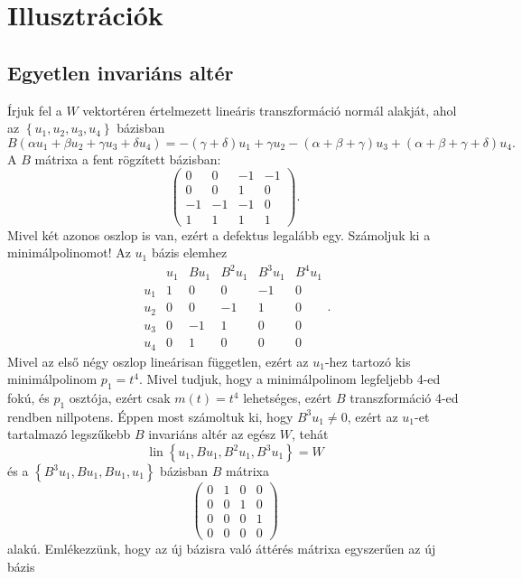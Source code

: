 \documentclass[9pt, a4paper, showtrims]{memoir}
\theoremstyle{plain}
\theoremstyle{remark}
\theoremstyle{definition}
\DeclareMathOperator{\lin}{lin}
\begin{document}
\section{Illusztrációk}
\subsection{Egyetlen invariáns altér}
Írjuk fel a $W$ vektortéren értelmezett lineáris transzformáció normál alakját,
ahol az $\left\{ u_1,u_2,u_3,u_4 \right\}$ bázisban
\[
    B\left( \alpha u_1+\beta u_2+\gamma u_3+\delta u_4 \right)=
    -\left( \gamma + \delta \right)u_1
    +\gamma u_2
    -\left( \alpha+\beta+\gamma \right)u_3
    +\left( \alpha+\beta+\gamma+\delta \right)u_4.
\]
A $B$ mátrixa a fent rögzített bázisban:
\[
    \begin{pmatrix}
        0 & 0 & -1&-1\\
        0 & 0 & 1 & 0\\
        -1 & -1& -1& 0\\
        1 & 1 & 1 & 1
    \end{pmatrix}.
\]
Mivel két azonos oszlop is van, ezért a defektus legalább egy.
Számoljuk ki a minimálpolinomot!
Az $u_1$ bázis elemhez
\[
\begin{array}{c|cccccc}
    & u_1 & Bu_1 & B^2u_1 & B^3u_1 & B^4u_1\\
    \hline
    u_1&   1 &    0 &      0 &  -1&   0\\
    u_2&   0 &    0 &     -1 &   1&   0\\
    u_3&   0 &   -1 &      1 &   0&   0\\
    u_4&   0 &    1 &      0 &   0&   0
\end{array}.
\]
Mivel az első négy oszlop lineárisan független,
ezért az $u_1$-hez tartozó kis minimálpolinom $p_1=t^4.$
Mivel tudjuk, hogy a minimálpolinom legfeljebb 4-ed fokú, és 
$p_1$ osztója, ezért csak $m\left( t \right)=t^4$ lehetséges,
ezért $B$ transzformáció 4-ed rendben nillpotens.
Éppen most számoltuk ki, hogy $B^3u_1\neq 0$, ezért 
az $u_1$-et tartalmazó legszűkebb $B$ invariáns altér az egész $W$,
tehát
\[
    \lin\left\{ u_1,Bu_1,B^2u_1,B^3u_1 \right\}=W
\]
és a $\left\{ B^3u_1,Bu_1,Bu_1,u_1 \right\}$ bázisban $B$ mátrixa
\[
    \begin{pmatrix}
        0&1&0&0\\
        0&0&1&0\\
        0&0&0&1\\
        0&0&0&0
    \end{pmatrix}
\]
alakú.
Emlékezzünk, hogy az új bázisra való áttérés mátrixa egyszerűen az új bázis
\end{document}
